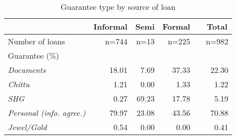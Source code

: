 \begin{table}[htbp]
  \center
  \caption{Guarantee type by source of loan}
    \begin{tabular}{lrrrrr}
    \toprule
          & \multicolumn{1}{c}{Informal} & \multicolumn{1}{c}{Semi} & \multicolumn{1}{c}{Formal} &       & \multicolumn{1}{c}{Total} \\
    \midrule
    Number of loans & n=744 & n=13  & n=225 &       & n=982 \\
    Guarantee (\%) &       &       &       &       &  \\
    \hspace*{0.2cm} \textit{Documents} & 18.01 & 7.69  & 37.33 &       & 22.30 \\
    \hspace*{0.2cm} \textit{Chittu} & 1.21  & 0.00  & 1.33  &       & 1.22 \\
    \hspace*{0.2cm} \textit{SHG} & 0.27  & 69.23 & 17.78 &       & 5.19 \\
    \hspace*{0.2cm} \textit{Personal (info. agree.)} & 79.97 & 23.08 & 43.56 &       & 70.88 \\
    \hspace*{0.2cm} \textit{Jewel/Gold} & 0.54  & 0.00  & 0.00  &       & 0.41 \\
    \bottomrule
    \end{tabular}%
  \label{appendix:guarantee}%
\end{table}%
